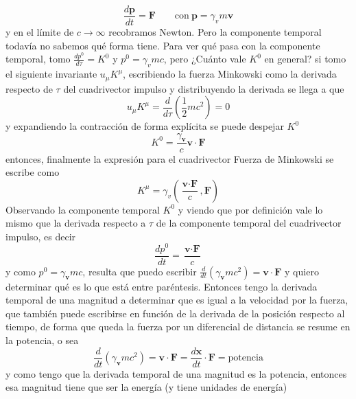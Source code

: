 \begin{equation*}
    \frac{d\textbf{p}}{dt} = \textbf{F}
    \quad
    \quad
    \mbox{con}\
    \textbf{p} = \gamma_{v}m \textbf{v}
\end{equation*}
y en el límite de $c \to \infty$ recobramos Newton. Pero la componente temporal todavía no sabemos qué forma tiene. Para ver qué pasa con la componente temporal, tomo $\frac{dp^{0}}{d\tau} = K^{0}$ y $p^{0} = \gamma_{v} m c$, pero ¿Cuánto vale $K^{0}$ en general? si tomo el siguiente invariante $u_{\mu}K^{\mu}$, escribiendo la fuerza Minkowski como la derivada respecto de $\tau$ del cuadrivector impulso y distribuyendo la derivada se llega a que 
\begin{equation*}
    u_{\mu}K^{\mu} = 
    \frac{d}{d\tau}
    \left(
        \frac{1}{2}mc^{2}
    \right) = 0
\end{equation*}
y expandiendo la contracción de forma explícita se puede despejar $K^{0}$
\begin{equation*}
    K^{0} = \frac{\gamma_{\textbf{v}}}{c}\textbf{v}\cdot \textbf{F}
\end{equation*}
entonces, finalmente la expresión para el cuadrivector Fuerza de Minkowski se escribe como
\begin{equation*}
    K^{\mu} = \gamma_{v}
    \left(
        \frac{\textbf{v}\cdot \textbf{F}}{c}, \textbf{F}
    \right)
\end{equation*}
Observando la componente temporal $K^{0}$ y viendo que por definición vale lo mismo que la derivada respecto a $\tau$ de la componente temporal del cuadrivector impulso, es decir
\begin{equation*}
    \frac{dp^{0}}{dt}
    = \frac{\textbf{v}\cdot \textbf{F}}{c}
\end{equation*}
y como $p^{0} = \gamma_{\textbf{v}}mc$, resulta que puedo escribir $\frac{d}{dt}(\gamma_{\textbf{v}}mc^{2}) = \textbf{v}\cdot\textbf{F}$ y quiero determinar qué es lo que está entre paréntesis. Entonces tengo la derivada temporal de una magnitud a determinar que es igual a la velocidad por la fuerza, que también puede escribirse en función de la derivada de la posición respecto al tiempo, de forma que queda la fuerza por un diferencial de distancia se resume en la potencia, o sea
\begin{equation*}
    \frac{d}{dt}(\gamma_{\textbf{v}}m c^{2}) 
    = \textbf{v}\cdot \textbf{F} 
    = \frac{d\textbf{x}}{dt}\cdot \textbf{F}
    = \mbox{potencia}
\end{equation*}
y como tengo que la derivada temporal de una magnitud es la potencia, entonces esa magnitud tiene que ser la energía (y tiene unidades de energía)
